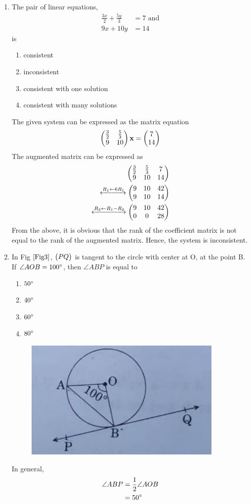 \documentclass[journal,12pt,twocolumn]{IEEEtran}
\begin{document}
\begin{enumerate}[label=1.\arabic*]
\item The pair of linear equations,
	\begin{align}
		\frac{3x}{2} + \frac{5y}{3} &=7  \text{ and}\\
		9x + 10y &= 14
	\end{align}
		is
\begin{enumerate}
\item consistent
\item inconsistent 
\item consistent with one solution
\item consistent with many solutions
\end{enumerate}
\solution  The given system can be expressed as the matrix equation
	\begin{align}
		\begin{pmatrix}\frac{3}{2} & \frac{5}{3} 
		\\
9 & 10 
		\end{pmatrix}\mathbf{x}=\begin{pmatrix}7  \\14\end{pmatrix}
	\end{align}
	The augmented matrix can be expressed as 
	\begin{align}
		\begin{pmatrix}\frac{3}{2} & \frac{5}{3} & 7
		\\
		9 & 10 & 14
		\end{pmatrix}
		\\
		\xleftrightarrow[]{R_1 \leftarrow 6R_1}
		\begin{pmatrix}9 & 10 & 42
		\\
		9 & 10 &14
		\end{pmatrix}
		\\
		\xleftrightarrow[]{R_2 \leftarrow R_1 - R_2}
		\begin{pmatrix}9 & 10 & 42
		\\
		0 & 0 & 28
		\end{pmatrix}
	\end{align}
From the above, it is obvious that the rank of the coefficient matrix is not equal to the rank of the augmented matrix.  Hence, the system is inconsistent.	

\item In Fig $\ref{Fig3}$, $\begin{pmatrix}PQ\end{pmatrix}$ is tangent to the circle with center at O, at the point B. If $\angle{AOB} = 100\degree$, then $\angle{ABP}$ is equal to
\begin{enumerate}
\item $50\degree$
\item $40\degree$
\item $60\degree$
\item $80\degree$
\end{enumerate}

\begin{figure}[h!]
    \centering
    \includegraphics[width=0.5\columnwidth]{Fig3.png}
	\caption{}
	\label{Fig3}
 \end{figure}
 \solution  In general,
	\begin{align}
		\angle{ABP} &= \frac{1}{2} \angle{AOB} 
		\\
		&= 50 \degree
	\end{align}

 \end{enumerate}
\end{document}

